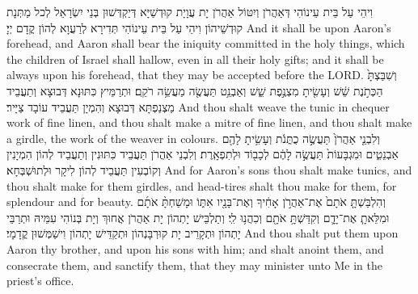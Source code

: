 {{וִיהֵי עַל בֵּית עֵינוֹהִי דְּאַהֲרֹן וְיִטּוֹל אַהֲרֹן יָת עֲוָיָת קוּדְשַׁיָּא דְּיַקְדְּשׁוּן בְּנֵי יִשְׂרָאֵל לְכל מַתְּנָת קוּדְשֵׁיהוֹן וִיהֵי עַל בֵּית עֵינוֹהִי תְּדִירָא לְרַעֲוָא לְהוֹן קֳדָם יְיָ׃}
{And it shall be upon Aaron’s forehead, and Aaron shall bear the iniquity committed in the holy things, which the children of Israel shall hallow, even in all their holy gifts; and it shall be always upon his forehead, that they may be accepted before the LORD.}{}
{וְשִׁבַּצְתָּ֙ הַכְּתֹ֣נֶת שֵׁ֔שׁ וְעָשִׂ֖יתָ מִצְנֶ֣פֶת שֵׁ֑שׁ וְאַבְנֵ֥ט תַּעֲשֶׂ֖ה מַעֲשֵׂ֥ה רֹקֵֽם׃
}
{וּתְרַמֵּיץ כִּתּוּנָא דְּבוּצָא וְתַעֲבֵיד מַצְנַפְתָּא דְּבוּצָא וְהִמְיָן תַּעֲבֵיד עוֹבָד צַיָּיר׃}
{And thou shalt weave the tunic in chequer work of fine linen, and thou shalt make a mitre of fine linen, and thou shalt make a girdle, the work of the weaver in colours.}{}
{וְלִבְנֵ֤י אַהֲרֹן֙ תַּעֲשֶׂ֣ה כֻתֳּנֹ֔ת וְעָשִׂ֥יתָ לָהֶ֖ם אַבְנֵטִ֑ים וּמִגְבָּעוֹת֙ תַּעֲשֶׂ֣ה לָהֶ֔ם לְכָב֖וֹד וּלְתִפְאָֽרֶת׃
}
{וְלִבְנֵי אַהֲרֹן תַּעֲבֵיד כִּתּוּנִין וְתַעֲבֵיד לְהוֹן הִמְיָנִין וְקוֹבְעִין תַּעֲבֵיד לְהוֹן לִיקָר וּלְתוּשְׁבְּחָא׃}
{And for Aaron’s sons thou shalt make tunics, and thou shalt make for them girdles, and head-tires shalt thou make for them, for splendour and for beauty.}{}
{וְהִלְבַּשְׁתָּ֤ אֹתָם֙ אֶת־אַהֲרֹ֣ן אָחִ֔יךָ וְאֶת־בָּנָ֖יו אִתּ֑וֹ וּמָשַׁחְתָּ֨ אֹתָ֜ם וּמִלֵּאתָ֧ אֶת־יָדָ֛ם וְקִדַּשְׁתָּ֥ אֹתָ֖ם וְכִהֲנ֥וּ לִֽי׃
}
{וְתַלְבֵּישׁ יָתְהוֹן יָת אַהֲרֹן אֲחוּךְ וְיָת בְּנוֹהִי עִמֵּיהּ וּתְרַבֵּי יָתְהוֹן וּתְקָרֵיב יָת קוּרְבָּנְהוֹן וּתְקַדֵּישׁ יָתְהוֹן וִישַׁמְּשׁוּן קֳדָמָי׃}
{And thou shalt put them upon Aaron thy brother, and upon his sons with him; and shalt anoint them, and consecrate them, and sanctify them, that they may minister unto Me in the priest’s office.}{}
}
